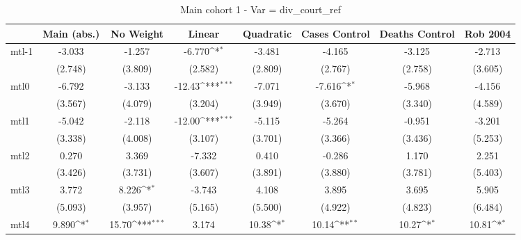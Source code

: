 \documentclass{article}
\begin{document}
{
\def\sym#1{\ifmmode^{#1}\else\(^{#1}\)\fi}
\begin{longtable}{l*{7}{c}}
\caption{Main cohort 1 - Var = div\_court\_ref}\\
\hline\hline\endfirsthead\hline\endhead\hline\endfoot\endlastfoot
                &\multicolumn{1}{c}{Main (abs.)}&\multicolumn{1}{c}{No Weight}&\multicolumn{1}{c}{Linear}&\multicolumn{1}{c}{Quadratic}&\multicolumn{1}{c}{Cases Control}&\multicolumn{1}{c}{Deaths Control}&\multicolumn{1}{c}{Rob 2004}\\
\hline
mtl-1           &   -3.033         &   -1.257         &   -6.770\sym{*}  &   -3.481         &   -4.165         &   -3.125         &   -2.713         \\
                &  (2.748)         &  (3.809)         &  (2.582)         &  (2.809)         &  (2.767)         &  (2.758)         &  (3.605)         \\
mtl0            &   -6.792         &   -3.133         &   -12.43\sym{***}&   -7.071         &   -7.616\sym{*}  &   -5.968         &   -4.156         \\
                &  (3.567)         &  (4.079)         &  (3.204)         &  (3.949)         &  (3.670)         &  (3.340)         &  (4.589)         \\
mtl1            &   -5.042         &   -2.118         &   -12.00\sym{***}&   -5.115         &   -5.264         &   -0.951         &   -3.201         \\
                &  (3.338)         &  (4.008)         &  (3.107)         &  (3.701)         &  (3.366)         &  (3.436)         &  (5.253)         \\
mtl2            &    0.270         &    3.369         &   -7.332         &    0.410         &   -0.286         &    1.170         &    2.251         \\
                &  (3.426)         &  (3.731)         &  (3.607)         &  (3.891)         &  (3.880)         &  (3.781)         &  (5.403)         \\
mtl3            &    3.772         &    8.226\sym{*}  &   -3.743         &    4.108         &    3.895         &    3.695         &    5.905         \\
                &  (5.093)         &  (3.957)         &  (5.165)         &  (5.500)         &  (4.922)         &  (4.823)         &  (6.484)         \\
mtl4            &    9.890\sym{*}  &    15.70\sym{***}&    3.174         &    10.38\sym{*}  &    10.14\sym{**} &    10.27\sym{*}  &    10.81\sym{*}  \\

\end{longtable}}
\end{document}
